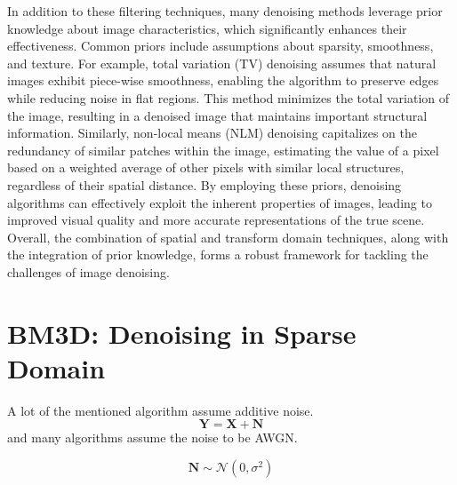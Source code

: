 In addition to these filtering techniques, many denoising methods leverage prior knowledge about image characteristics, which significantly enhances their effectiveness. Common priors include assumptions about sparsity, smoothness, and texture. For example, total variation (TV) denoising assumes that natural images exhibit piece-wise smoothness, enabling the algorithm to preserve edges while reducing noise in flat regions. This method minimizes the total variation of the image, resulting in a denoised image that maintains important structural information. Similarly, non-local means (NLM) denoising capitalizes on the redundancy of similar patches within the image, estimating the value of a pixel based on a weighted average of other pixels with similar local structures, regardless of their spatial distance. By employing these priors, denoising algorithms can effectively exploit the inherent properties of images, leading to improved visual quality and more accurate representations of the true scene. Overall, the combination of spatial and transform domain techniques, along with the integration of prior knowledge, forms a robust framework for tackling the challenges of image denoising.


\section{BM3D: Denoising in Sparse Domain}
A lot of the mentioned algorithm assume additive noise.
\begin{equation*}
    \mathbf{Y} = \mathbf{X} + \mathbf{N}
\end{equation*}
and many algorithms assume the noise to be \gls{AWGN}.

\begin{equation*}
    \mathbf{N} \sim \mathcal{N}(0, \sigma^2)
\end{equation*}


